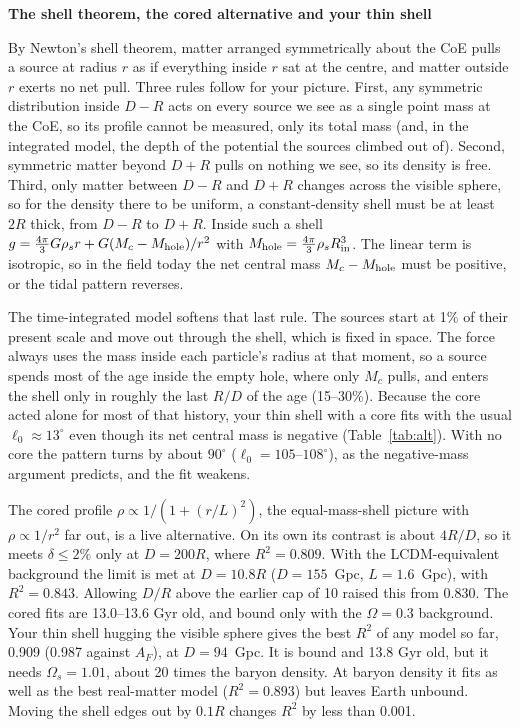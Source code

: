 \documentclass[10pt,letterpaper]{article}
\begin{document}
\clearpage
\begin{center}{\large\bfseries The shell theorem, the cored alternative and your thin shell}\end{center}
\vspace{-4pt}
By Newton's shell theorem, matter arranged symmetrically about the CoE pulls a source at radius $r$ as if everything inside $r$ sat at the centre, and matter outside $r$ exerts no net pull. Three rules follow for your picture. First, any symmetric distribution inside $D-R$ acts on every source we see as a single point mass at the CoE, so its profile cannot be measured, only its total mass (and, in the integrated model, the depth of the potential the sources climbed out of). Second, symmetric matter beyond $D+R$ pulls on nothing we see, so its density is free. Third, only matter between $D-R$ and $D+R$ changes across the visible sphere, so for the density there to be uniform, a constant-density shell must be at least $2R$ thick, from $D-R$ to $D+R$. Inside such a shell $g=\tfrac{4\pi}{3}G\rho_s r+G(M_c-M_{\rm hole})/r^2$ with $M_{\rm hole}=\tfrac{4\pi}{3}\rho_sR_{\rm in}^3$. The linear term is isotropic, so in the field today the net central mass $M_c-M_{\rm hole}$ must be positive, or the tidal pattern reverses.

The time-integrated model softens that last rule. The sources start at 1\% of their present scale and move out through the shell, which is fixed in space. The force always uses the mass inside each particle's radius at that moment, so a source spends most of the age inside the empty hole, where only $M_c$ pulls, and enters the shell only in roughly the last $R/D$ of the age (15--30\%). Because the core acted alone for most of that history, your thin shell with a core fits with the usual $\ell_0\approx13^\circ$ even though its net central mass is negative (Table~\ref{tab:alt}). With no core the pattern turns by about $90^\circ$ ($\ell_0=105$--$108^\circ$), as the negative-mass argument predicts, and the fit weakens.

The cored profile $\rho\propto1/(1+(r/L)^2)$, the equal-mass-shell picture with $\rho\propto1/r^2$ far out, is a live alternative. On its own its contrast is about $4R/D$, so it meets $\delta\le2\%$ only at $D=200R$, where $R^2=0.809$. With the LCDM-equivalent background the limit is met at $D=10.8R$ ($D=155$~Gpc, $L=1.6$~Gpc), with $R^2=0.843$. Allowing $D/R$ above the earlier cap of 10 raised this from 0.830. The cored fits are 13.0--13.6 Gyr old, and bound only with the $\Omega=0.3$ background. Your thin shell hugging the visible sphere gives the best $R^2$ of any model so far, 0.909 (0.987 against $A_F$), at $D=94$~Gpc. It is bound and 13.8 Gyr old, but it needs $\Omega_s=1.01$, about 20 times the baryon density. At baryon density it fits as well as the best real-matter model ($R^2=0.893$) but leaves Earth unbound. Moving the shell edges out by $0.1R$ changes $R^2$ by less than 0.001.
\end{document}
